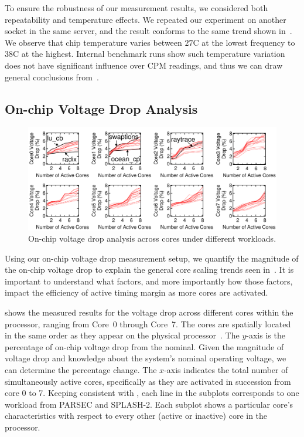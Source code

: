 To ensure the robustness of our measurement results, we considered both repeatability and temperature effects. We repeated our experiment on another socket in the same server, and the result conforms to the same trend shown in~. We observe that chip temperature varies between $27$\textdegree C at the lowest frequency to $38$\textdegree C at the highest. Internal benchmark runs show such temperature variation does not have significant influence over CPM readings, and thus we can draw general conclusions from~.

\subsection{On-chip Voltage Drop Analysis}
\label{sec:voltage:rootcause:vdrop-analysis}

\begin{figure}
  \centering
  \includegraphics[trim=0 0 0 0,clip,width=\linewidth]{graphs/voltage/cpm_scale_variation.pdf}
  \captionsetup{width=0.95\textwidth}
  \caption{On-chip voltage drop analysis across cores under different workloads.}
\label{fig:cpm-variation} 
\end{figure}

Using our on-chip voltage drop measurement setup, we quantify the magnitude of the on-chip voltage drop to explain the general core scaling trends seen in~. It is important to understand what factors, and more importantly how those factors, impact the efficiency of active timing margin as more cores are activated. 

 shows the measured results for the voltage drop across different cores within the processor, ranging from Core~0 through Core~7. The cores are spatially located in the same order as they appear on the physical processor~\cite{zyuban2013ibm}. The $y$-axis is the percentage of on-chip voltage drop from the nominal. Given the magnitude of voltage drop and knowledge about the system's nominal operating voltage, we can determine the percentage change. The $x$-axis indicates the total number of simultaneously active cores, specifically as they are activated in succession from core 0 to 7. Keeping consistent with , each line in the subplots corresponds to one workload from PARSEC and SPLASH-2. Each subplot shows a particular core's characteristics with respect to every other (active or inactive) core in the processor. 

